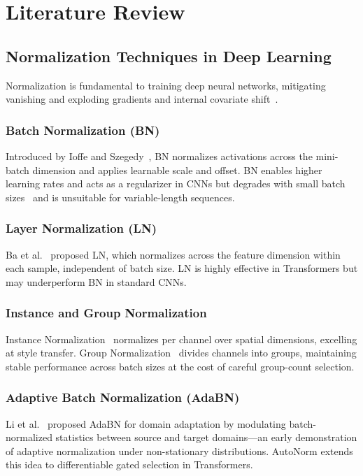 \documentclass[final,3p,times,twocolumn]{elsarticle}
\begin{document}
\section{Literature Review}

\subsection{Normalization Techniques in Deep Learning}

Normalization is fundamental to training deep neural networks,
mitigating vanishing and exploding gradients and internal covariate
shift~\cite{ioffe2015batch,ba2016layernorm,ulyanov2016instance,wu2018group}.

\subsubsection{Batch Normalization (BN)}
Introduced by Ioffe and Szegedy~\cite{ioffe2015batch}, BN normalizes
activations across the mini-batch dimension and applies learnable scale
and offset. BN enables higher learning rates and acts as a regularizer
in CNNs but degrades with small batch sizes~\cite{wu2018group} and is
unsuitable for variable-length sequences.

\subsubsection{Layer Normalization (LN)}
Ba et al.~\cite{ba2016layernorm} proposed LN, which normalizes across
the feature dimension within each sample, independent of batch size.
LN is highly effective in Transformers but may underperform BN in
standard CNNs.

\subsubsection{Instance and Group Normalization}
Instance Normalization~\cite{ulyanov2016instance} normalizes per
channel over spatial dimensions, excelling at style transfer. Group
Normalization~\cite{wu2018group} divides channels into groups,
maintaining stable performance across batch sizes at the cost of
careful group-count selection.

\subsubsection{Adaptive Batch Normalization (AdaBN)}
Li et al.~\cite{li2018adaptive} proposed AdaBN for domain adaptation
by modulating batch-normalized statistics between source and target
domains---an early demonstration of adaptive normalization under
non-stationary distributions. AutoNorm extends this idea to
differentiable gated selection in Transformers.
\end{document}
